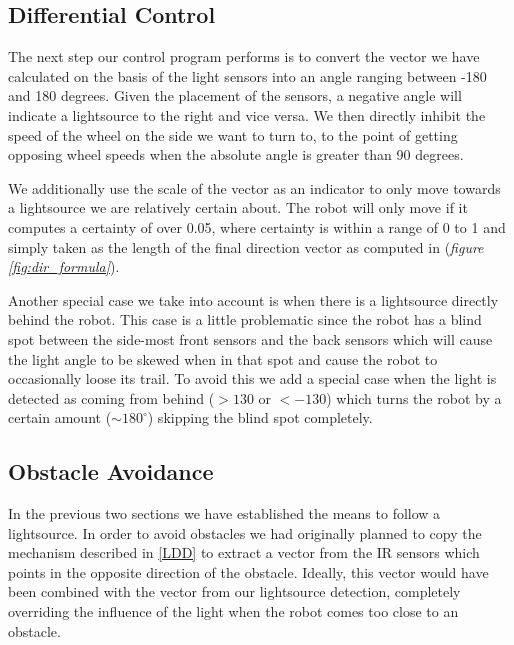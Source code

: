 \documentclass[paper=a4, fontsize=12pt]{scrartcl}	%
\numberwithin{equation}{section}		%
\numberwithin{figure}{section}			%
\numberwithin{table}{section}				%
\begin{document}
\pagebreak
\subsection{Differential Control}
The next step our control program performs is to convert the vector we have calculated on the basis of the light sensors into an angle ranging between -180 and 180 degrees. Given the placement of the sensors, a negative angle will indicate a lightsource to the right and vice versa. We then directly inhibit the speed of the wheel on the side we want to turn to, to the point of getting opposing wheel speeds when the absolute angle is greater than 90 degrees.


We additionally use the scale of the vector as an indicator to only move towards a lightsource we are relatively certain about. The robot will only move if it computes a certainty of over 0.05, where certainty is within a range of 0 to 1 and simply taken as the length of the final direction vector as computed in (\emph{figure \ref{fig:dir_formula}}).

Another special case we take into account is when there is a lightsource directly behind the robot. This case is a little problematic since the robot has a blind spot between the side-most front sensors and the back sensors which will cause the light angle to be skewed when in that spot and cause the robot to occasionally loose its trail. To avoid this we add a special case when the light is detected as coming from behind (\(> 130\) or \(< -130\)) which turns the robot by a certain amount (\(\sim180^{\circ}\)) skipping the blind spot completely.
\subsection{Obstacle Avoidance}
In the previous two sections we have established the means to follow a lightsource. In order to avoid obstacles we had originally planned to copy the mechanism described in \ref{LDD} to extract a vector from the IR sensors which points in the opposite direction of the obstacle. Ideally, this vector would have been combined with the vector from our lightsource detection, completely overriding the influence of the light when the robot comes too close to an obstacle. 
\end{document}

